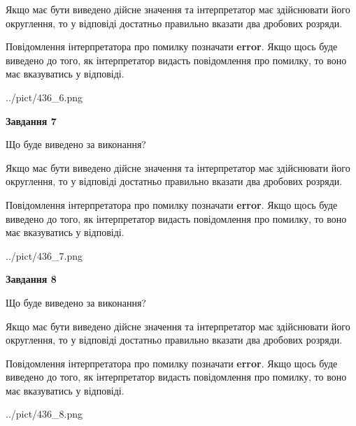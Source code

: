 \documentclass[12pt, ukrainian]{article}
\begin{document}
{\begin {Large}
Якщо має бути виведено дійсне значення та інтерпретатор має здійснювати його округлення, 
то у відповіді достатньо правильно вказати два дробових розряди.

Повідомлення інтерпретатора про помилку позначати \textbf{error}.
Якщо щось буде виведено до того, як інтерпретатор видасть повідомлення про помилку, 
то воно має вказуватись у відповіді. \par

\begin{center}
	{../pict/436_6.png}
\end{center}
\newpage

{\begin {center}\textbf{Завдання 7}\end {center}}\par
Що буде виведено за виконання? \par

Якщо має бути виведено дійсне значення та інтерпретатор має здійснювати його округлення, 
то у відповіді достатньо правильно вказати два дробових розряди.

Повідомлення інтерпретатора про помилку позначати \textbf{error}.
Якщо щось буде виведено до того, як інтерпретатор видасть повідомлення про помилку, 
то воно має вказуватись у відповіді. \par

\begin{center}
	{../pict/436_7.png}
\end{center}
\newpage

{\begin {center}\textbf{Завдання 8}\end {center}}\par
Що буде виведено за виконання? \par

Якщо має бути виведено дійсне значення та інтерпретатор має здійснювати його округлення, 
то у відповіді достатньо правильно вказати два дробових розряди.

Повідомлення інтерпретатора про помилку позначати \textbf{error}.
Якщо щось буде виведено до того, як інтерпретатор видасть повідомлення про помилку, 
то воно має вказуватись у відповіді. \par

\begin{center}
	{../pict/436_8.png}
\end{center}
\newpage


\end{Large}}
\end{document}
